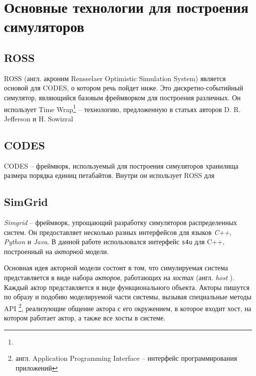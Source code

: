 \documentclass[../diploma.tex]{subfile}
\begin{document}
    \section{Основные технологии для построения симуляторов}
    \label{sec:simulation_techonogies}

    \subsection{ROSS}

    ROSS (англ. акроним Rensselaer Optimistic Simulation System) \cite{ross}
    является основой для CODES, о котором речь пойдет ниже. Это
    дискретно-событийный симулятор, являющийся базовым фреймворком для
    построения различных. Он использует Time Wrap\footnote{} -- технологию, предложенную в статьях авторов D. R. Jefferson и H. Sowizral \cite{}


    \subsection{CODES}

    CODES \cite{codes} -- фреймворк, используемый для построения симуляторов
    хранилища размера порядка единиц петабайтов. Внутри он использует ROSS для 
    

    \subsection{SimGrid}
    \label{sec:simulation_techonogies:subsec:simgrid}
    \textit{Simgrid}\cite{simgrid} -- фреймворк, упрощающий разработку
    симуляторов распределенных систем. Он предоставляет несколько разных
    интерфейсов для языков \textit{C++}, \textit{Python} и \textit{Java}. В
    данной работе использовался интерфейс \texttt{s4u} для C++, построенный на
    \textit{акторной} модели. 

    Основная идея акторной модели состоит в том, что симулируемая система
    представляется в виде набора \textit{акторов}, работающих на \textit{хостах}
    (англ. \textit{host} ). Каждый актор
    представляется в виде функционального объекта. Акторы пишутся по образу и
    подобию моделируемой части системы, вызывая специальные методы API
    \footnote{англ. Application Programming Interface -- интерфейс
    программирования приложений}, реализующие общение актора с его окружением, в
    которое входит хост, на котором работает актор, а также все хосты в системе.
    
\end{document}
